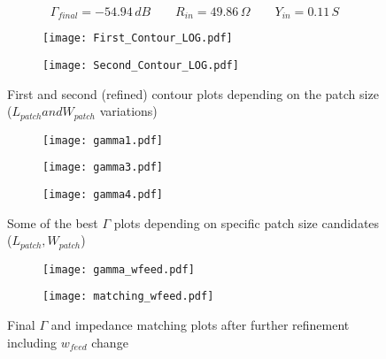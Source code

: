 \documentclass[12pt,a4paper]{article}
\begin{document}
{\begin{equation*}
	\Gamma_{final}=-54.94\,dB\qquad R_{in}=49.86\,\Omega\qquad Y_{in}=0.11\,S
\end{equation*}
\begin{figure}[h]
	\begin{center}
		\begin{subfigure}{0.5\linewidth}
			\texttt{[image: First\_Contour\_LOG.pdf]}
		\end{subfigure}
		\begin{subfigure}{0.5\linewidth}
			\texttt{[image: Second\_Contour\_LOG.pdf]}
		\end{subfigure}
	\caption{\selectfont
		\color{gray}First and second (refined) contour plots depending on the patch size ($L_{patch} and W_{patch}$ variations)}
	\end{center}  
\end{figure}
\begin{figure}[h]
	\begin{center}
		\begin{subfigure}{0.5\linewidth}
			\texttt{[image: gamma1.pdf]}
		\end{subfigure}
		\begin{subfigure}{0.5\linewidth}
		\texttt{[image: gamma3.pdf]}
	\end{subfigure}
	\begin{subfigure}{0.5\linewidth}
	\texttt{[image: gamma4.pdf]}
\end{subfigure}
	\caption{\selectfont
	\color{gray}Some of the best $\Gamma$ plots depending on specific patch size candidates ($L_{patch},W_{patch}$)}
	\end{center}  
\end{figure}
\begin{figure}[h]
	\begin{center}
		\begin{subfigure}{0.5\linewidth}
			\texttt{[image: gamma\_wfeed.pdf]}
		\end{subfigure}
		\begin{subfigure}{0.5\linewidth}
			\texttt{[image: matching\_wfeed.pdf]}
		\end{subfigure}
		\caption{\selectfont
		\color{gray}
	Final $\Gamma$ and impedance matching plots after further refinement including $w_{feed}$ change}
	\end{center}  
\end{figure}
\begin{figure}[h]

\end{figure}}
\end{document}
